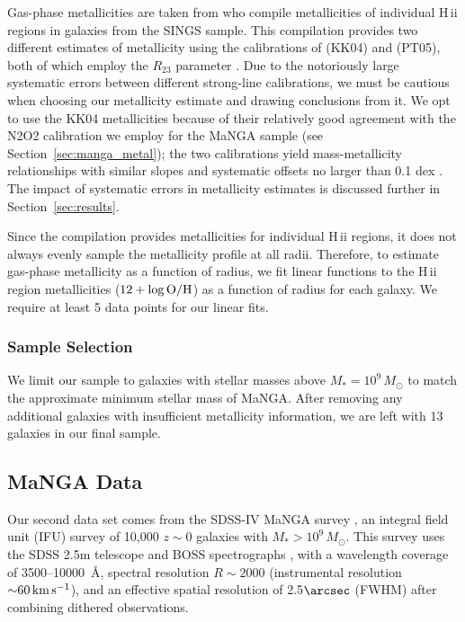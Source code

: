\documentclass[fleqn,usenatbib]{mnras}
\newcommand{\msun}{M_{\odot}}
\newcommand{\HII}{{{\sc H\,ii}}}
\begin{document}
Gas-phase metallicities are taken from \citet{Moustakas10} who compile metallicities of individual {\HII} regions in galaxies from the SINGS sample.  This compilation provides two different estimates of metallicity using the calibrations of \citet{Kobulnicky04} (KK04) and \citet{Pilyugin05} (PT05), both of which employ the $R_{23}$ parameter \citep{Pagel79}.  Due to the notoriously large systematic errors between different strong-line calibrations, we must be cautious when choosing our metallicity estimate and drawing conclusions from it.  We opt to use the KK04 metallicities because of their relatively good agreement with the N2O2 calibration we employ for the MaNGA sample (see Section~\ref{sec:manga_metal}); the two calibrations yield mass-metallicity relationships with similar slopes and systematic offsets no larger than 0.1 dex \citep{Kewley08}. The impact of systematic errors in metallicity estimates is discussed further in Section~\ref{sec:results}.

Since the \citet{Moustakas10} compilation provides metallicities for individual {\HII} regions, it does not always evenly sample the metallicity profile at all radii.  Therefore, to estimate gas-phase metallicity as a function of radius, we fit linear functions to the {\HII} region metallicities ($12+\log {\rm O/H}$) as a function of radius for each galaxy.  We require at least 5 data points for our linear fits.

\subsubsection{Sample Selection}
We limit our sample to galaxies with stellar masses above $M_*=10^9\,M_{\odot}$ to match the approximate minimum stellar mass of MaNGA.  After removing any additional galaxies with insufficient metallicity information, we are left with 13 galaxies in our final sample.   

\subsection{MaNGA Data}

Our second data set comes from the SDSS-IV MaNGA survey \citep{Bundy15,Drory15,Law15,Yan16b,Yan16a,Law16,SDSS16,Blanton17}, an integral field unit (IFU)
survey of 10,000 $z{\sim}0$ galaxies with $M_*>10^9\,\msun$. This survey uses the SDSS 2.5m telescope \citep{Gunn06} and BOSS
spectrographs \citep{Smee13}, with a wavelength coverage of \mbox{3500--10000 {\AA}}, spectral resolution $R\sim2000$
(instrumental resolution ${\sim}60\,{\rm km\,s^{-1}}$), and an effective spatial resolution of 2.5$\arcsec$ (FWHM) after combining dithered observations.
\end{document}
